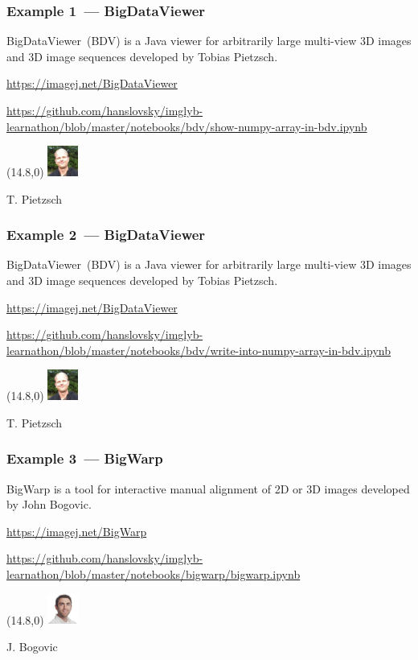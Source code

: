 \documentclass[%
]{beamer}
\newcommand{\urlScrSz}[1]{\scriptsize\url{#1}}
\begin{document}
\begin{frame}
    \frametitle{Example 1~--- BigDataViewer}
    BigDataViewer~(BDV) is a Java viewer for arbitrarily large multi-view 3D images and 3D image
    sequences developed by Tobias Pietzsch.
    
    \urlScrSz{https://imagej.net/BigDataViewer}
    
    \urlScrSz{https://github.com/hanslovsky/imglyb-learnathon/blob/master/notebooks/bdv/show-numpy-array-in-bdv.ipynb}

    \begin{textblock}{3}(14.8,0)
        \tiny\includegraphics[width=1cm]{fig/people/pietzsch.jpg}

        T. Pietzsch
    \end{textblock}
\end{frame}

\begin{frame}
    \frametitle{Example 2~--- BigDataViewer}
    BigDataViewer~(BDV) is a Java viewer for arbitrarily large multi-view 3D images and 3D image
    sequences developed by Tobias Pietzsch.
    
    \urlScrSz{https://imagej.net/BigDataViewer}
    
    \urlScrSz{https://github.com/hanslovsky/imglyb-learnathon/blob/master/notebooks/bdv/write-into-numpy-array-in-bdv.ipynb}

    \begin{textblock}{3}(14.8,0)
        \tiny\includegraphics[width=1cm]{fig/people/pietzsch.jpg}

        T. Pietzsch
    \end{textblock}
\end{frame}

\begin{frame}
    \frametitle{Example 3~--- BigWarp}
    BigWarp is a tool for interactive manual alignment of 2D or 3D images developed by John Bogovic.

    \urlScrSz{https://imagej.net/BigWarp}

    \urlScrSz{https://github.com/hanslovsky/imglyb-learnathon/blob/master/notebooks/bigwarp/bigwarp.ipynb}

        \begin{textblock}{3}(14.8,0)
        \tiny\includegraphics[width=1cm]{fig/people/bogovic.jpg}

        J. Bogovic
    \end{textblock}
\end{frame}
\end{document}
